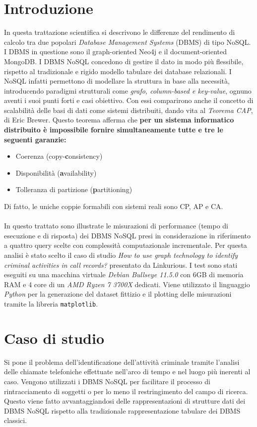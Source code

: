 \section{Introduzione}
In questa trattazione scientifica si descrivono le differenze del rendimento 
di calcolo tra due popolari \textit{Database Management Systems} (DBMS) di tipo NoSQL. 
I DBMS in questione sono il graph-oriented Neo4j e il document-oriented MongoDB. 
I DBMS NoSQL concedono di gestire il dato in modo più flessibile, 
rispetto al tradizionale e rigido modello tabulare dei database relazionali. 
I NoSQL infatti permettono di modellare la struttura in base alla necessità,
introducendo paradigmi strutturali come \textit{grafo, column-based e key-value},
ognuno aventi i suoi punti forti e casi obiettivo. Con essi comparirono
anche il concetto di scalabilità delle basi di dati come sistemi distribuiti,
dando vita al \textit{Teorema CAP}, di Eric Brewer. Questo teorema afferma che
\textbf{per un sistema informatico distribuito è impossibile fornire simultaneamente
tutte e tre le seguenti garanzie:}
\begin{itemize}
    \item Coerenza (copy-\textbf{c}onsistency)
    \item Disponibilità (\textbf{a}vailability)
    \item Tolleranza di partizione (\textbf{p}artitioning)
\end{itemize}
Di fatto, le uniche coppie formabili con sistemi reali sono CP, AP e CA. \\\\
In questo trattato sono illustrate le misurazioni di performance 
(tempo di esecuzione e di risposta) dei DBMS NoSQL presi in considerazione 
in riferimento a quattro query scelte con complessità computazionale incrementale.
Per questa analisi è stato scelto il caso di studio \textit{How to use graph 
technology to identify criminal activities in call records?}\cite{linkurious} presentato da Linkurious.
I test sono stati eseguiti su una macchina virtuale \textit{Debian Bullseye 11.5.0 }con 6GB di memoria RAM
e 4 core di un \textit{AMD Ryzen 7 3700X} dedicati. 
Viene utilizzato il linguaggio \textit{Python} per la generazione del dataset fittizio
e il plotting delle misurazioni tramite la libreria \texttt{matplotlib}.

\pagebreak
\section{Caso di studio}
Si pone il problema dell'identificazione dell'attività criminale tramite l'analisi
delle chiamate telefoniche effettuate nell'arco di tempo e nel luogo più inerenti al caso.
Vengono utilizzati i DBMS NoSQL per facilitare il processo di rintracciamento di soggetti o
per lo meno il restringimento del campo di ricerca. Questo viene fatto avvantaggiandosi delle rappresentazioni
di strutture dati dei DBMS NoSQL rispetto alla tradizionale rappresentazione tabulare dei DBMS classici.

